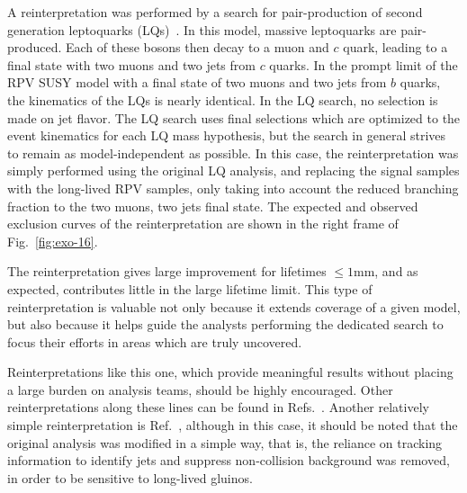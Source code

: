 A reinterpretation was performed by a search for pair-production of second
generation leptoquarks (LQs)~\cite{CMS-PAS-EXO-16-007,Sirunyan:2018ryt}. In this model, massive
leptoquarks are pair-produced.  Each of these bosons then decay to a muon and
$c$ quark, leading to a final state with two muons and two jets from $c$ quarks.
In the prompt limit of the RPV SUSY model with a final state of two muons and
two jets from $b$ quarks, the kinematics of the LQs is nearly identical. In the
LQ search, no selection is made on jet flavor. The LQ search uses final
selections which are optimized to the event kinematics for each LQ mass
hypothesis, but the search in general strives to remain as model-independent as
possible. In this case, the reinterpretation was simply performed using the
original LQ analysis, and replacing the signal samples with the long-lived RPV
samples, only taking into account the reduced branching fraction to the two
muons, two jets final state. The expected and observed exclusion curves of the
reinterpretation are shown in the right frame of Fig.~\ref{fig:exo-16}.

The reinterpretation gives large improvement for lifetimes $\leq1$mm, and as
expected, contributes little in the large lifetime limit. This type of
reinterpretation is valuable not only because it extends coverage of a given
model, but also because it helps guide the analysts performing the dedicated
search to focus their efforts in areas which are truly uncovered.

Reinterpretations like this one, which provide meaningful results without
placing a large burden on analysis teams, should be highly encouraged. Other reinterpretations along
these lines can be found in Refs.~\cite{ATLAS-CONF-2014-037,Sirunyan:2018vjp}. Another relatively simple
reinterpretation is Ref.~\cite{ATLAS-CONF-2018-003}, although in this case, it
should be noted that the original analysis was modified in a simple way, that is,
the reliance on tracking information to identify jets and suppress non-collision background was
removed, in order to be sensitive to long-lived gluinos.

